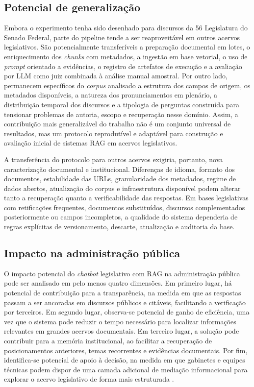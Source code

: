 \subsection{Potencial de generalização}

Embora o experimento tenha sido desenhado para discursos da 56\textordfeminine{} Legislatura do Senado Federal, parte do pipeline tende a ser reaproveitável em outros acervos legislativos. São potencialmente transferíveis a preparação documental em lotes, o enriquecimento dos \textit{chunks} com metadados, a ingestão em base vetorial, o uso de \textit{prompt} orientado a evidências, o registro de artefatos de execução e a avaliação por LLM como juiz combinada à análise manual amostral. Por outro lado, permanecem específicos do \textit{corpus} analisado a estrutura dos campos de origem, os metadados disponíveis, a natureza dos pronunciamentos em plenário, a distribuição temporal dos discursos e a tipologia de perguntas construída para tensionar problemas de autoria, escopo e recuperação nesse domínio. Assim, a contribuição mais generalizável do trabalho não é um conjunto universal de resultados, mas um protocolo reprodutível e adaptável para construção e avaliação inicial de sistemas RAG em acervos legislativos.

A transferência do protocolo para outros acervos exigiria, portanto, nova caracterização documental e institucional. Diferenças de idioma, formato dos documentos, estabilidade das URLs, granularidade dos metadados, regime de dados abertos, atualização do corpus e infraestrutura disponível podem alterar tanto a recuperação quanto a verificabilidade das respostas. Em bases legislativas com retificações frequentes, documentos substituídos, discursos complementados posteriormente ou campos incompletos, a qualidade do sistema dependeria de regras explícitas de versionamento, descarte, atualização e auditoria da base.

\subsection{Impacto na administração pública}

O impacto potencial do \textit{chatbot} legislativo com RAG na administração pública pode ser analisado em pelo menos quatro dimensões. Em primeiro lugar, há potencial de contribuição para a transparência, na medida em que as respostas passam a ser ancoradas em discursos públicos e citáveis, facilitando a verificação por terceiros. Em segundo lugar, observa-se potencial de ganho de eficiência, uma vez que o sistema pode reduzir o tempo necessário para localizar informações relevantes em grandes acervos documentais. Em terceiro lugar, a solução pode contribuir para a memória institucional, ao facilitar a recuperação de posicionamentos anteriores, temas recorrentes e evidências documentais. Por fim, identifica-se potencial de apoio à decisão, na medida em que gabinetes e equipes técnicas podem dispor de uma camada adicional de mediação informacional para explorar o acervo legislativo de forma mais estruturada \parencite{martelloteViola2025organizacaoConhecimento,deAlmeidaSantos2025aiGovernance,wfd2023guidelinesAiParliaments}.


